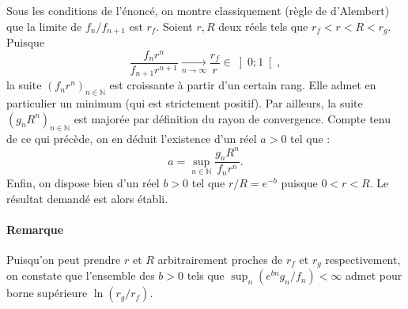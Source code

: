 Sous les conditions de l'énoncé, on montre classiquement (règle de d'Alembert) que la limite de $f_n/f_{n+1}$ est $r_f$.
Soient $r,R$ deux réels tels que $r_f < r < R < r_g$. Puisque
$$
\frac{f_n r^n}{f_{n+1}r^{n+1}} \xrightarrow[n\to\infty]{} \frac{r_f}{r} \in \left]0;1\right[,
$$
la suite $(f_n r^n)_{n\in\mathbb N}$ est croissante à partir d'un certain rang. Elle admet en particulier un minimum (qui est strictement positif).
Par ailleurs, la suite $(g_n R^n)_{n\in\mathbb N}$ est majorée par définition du rayon de convergence. Compte tenu de ce qui précède, on en déduit l'existence d'un réel $a > 0$ tel que :
$$
a = \sup_{n\in\mathbb N} \frac{g_n R^n}{f_n r^n}.
$$
Enfin, on dispose bien d'un réel $b > 0$ tel que $r/R = e^{-b}$ puisque $0 < r < R$.
Le résultat demandé est alors établi.

\paragraph{Remarque}
Puisqu'on peut prendre $r$ et $R$ arbitrairement proches de $r_f$ et $r_g$ respectivement, on constate que l'ensemble des $b > 0$ tels que $\sup_n (e^{bn} g_n/f_n) < \infty$ admet pour borne supérieure $\ln(r_g/r_f)$.
